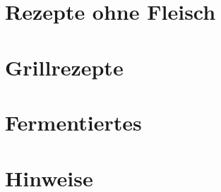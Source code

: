 \documentclass[
	a4paper, %
	BCOR=20mm,
	ngerman, %
	titlepage, %
	parskip=half, %
	final %
]{scrreprt}
\title{\Title\\}
\author{\Large \Author}
\begin{document}
\maketitle  %
\tableofcontents %


















\chapter{Rezepte ohne Fleisch}

%












\chapter{Grillrezepte}



\chapter{Fermentiertes}



\chapter{Hinweise}


\end{document}

